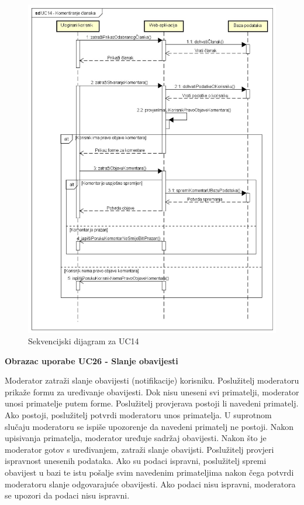 \eject

\begin{figure}[H]
	\includegraphics[scale=0.6]{slike/SekvencijskiDijagramUC14.jpg}
	\centering
	\caption{Sekvencijski dijagram za UC14}
	\label{fig:sekvencijski_dijagram_uc14}
\end{figure}

\eject

\textbf{Obrazac uporabe UC26 - Slanje obavijesti}

Moderator zatraži slanje obavijesti (notifikacije) korisniku. Poslužitelj moderatoru prikaže formu za uređivanje obavijesti. Dok nisu uneseni svi primatelji,
moderator unosi primatelje putem forme. Poslužitelj provjerava postoji li navedeni primatelj. Ako postoji, poslužitelj potvrdi moderatoru unos primatelja. U suprotnom slučaju
moderatoru se ispiše upozorenje da navedeni primatelj ne postoji.
Nakon upisivanja primatelja, moderator uređuje sadržaj obavijesti. Nakon što je moderator gotov s uređivanjem, zatraži slanje obavijsti. Poslužitelj provjeri ispravnost unesenih
podataka. Ako su podaci ispravni, poslužitelj spremi obavijest u bazi te istu pošalje svim navedenim primateljima nakon čega potvrdi moderatoru slanje odgovarajuće obavijesti.
Ako podaci nisu ispravni, moderatora se upozori da podaci nisu ispravni. 

